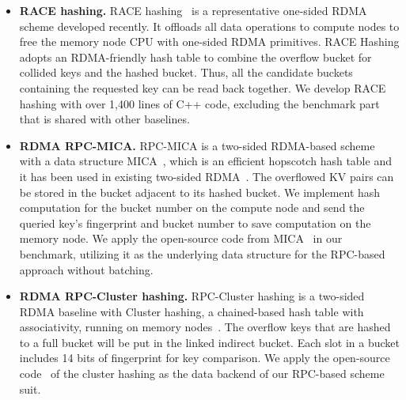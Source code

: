 \begin{itemize}[left=0em]
\vspace{-.3ex}
    \item \textbf{RACE hashing.}
    RACE hashing~\cite{race} is a representative one-sided RDMA scheme developed recently. It offloads all data operations to compute nodes to free the memory node CPU with one-sided RDMA primitives. RACE Hashing adopts an RDMA-friendly hash table to combine the overflow bucket for collided keys and the hashed bucket. Thus, all the candidate buckets containing the requested key can be read back together.
    We develop RACE hashing with over 1,400 lines of C++ code, excluding the benchmark part that is shared with other baselines.
    \item \textbf{RDMA RPC-MICA.}
    RPC-MICA is a two-sided RDMA-based scheme with a data structure MICA~\cite{mica,herd}, which is an efficient hopscotch hash table and it has been used in existing two-sided RDMA~\cite{herd,fasst}. The overflowed KV pairs can be stored in the bucket adjacent to its hashed bucket.
    We implement hash computation for the bucket number on the compute node and send the queried key's fingerprint and bucket number to save computation on the memory node. 
    We apply the open-source code from MICA~\cite{mica} in our benchmark, utilizing it as the underlying data structure for the RPC-based approach without batching.
    \item \textbf{RDMA RPC-Cluster hashing.}
    RPC-Cluster hashing is a two-sided RDMA baseline with Cluster hashing, a chained-based hash table with associativity, running on memory nodes~\cite{drtmh,drtmr}.
    The overflow keys that are hashed to a full bucket will be put in the linked indirect bucket. Each slot in a bucket includes 14 bits of fingerprint for key comparison. We apply the open-source code~\cite{drtm_code} of the cluster hashing as the data backend of our RPC-based scheme suit. 
    \vspace{-1ex}
\end{itemize}







\vspace{-1ex}

